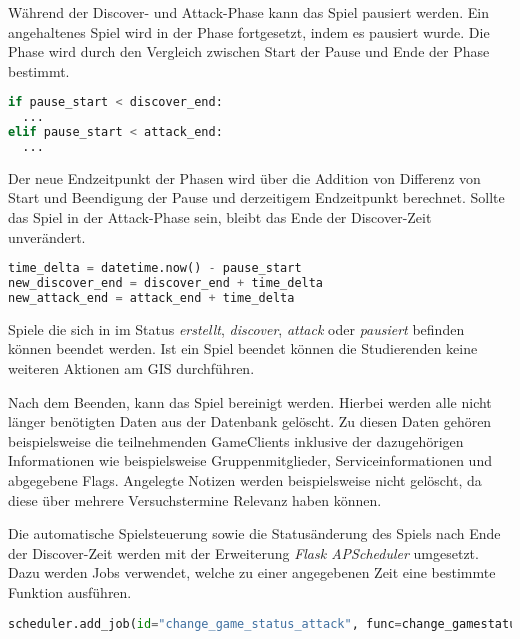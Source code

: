 Während der Discover- und Attack-Phase kann das Spiel pausiert werden. Ein angehaltenes Spiel wird in der Phase fortgesetzt, indem es pausiert wurde. Die Phase wird durch den Vergleich zwischen Start der Pause und Ende der Phase bestimmt.

\begin{lstlisting}[language=Python, frame=single, caption={GIS Spiel fortsetzen}, captionpos=b, label={lst:gis-resume-game}]
if pause_start < discover_end:
  ...
elif pause_start < attack_end:
  ...
\end{lstlisting}

Der neue Endzeitpunkt der Phasen wird über die Addition von Differenz von Start und Beendigung der Pause und derzeitigem Endzeitpunkt berechnet. Sollte das Spiel in der Attack-Phase sein, bleibt das Ende der Discover-Zeit unverändert.

\begin{lstlisting}[language=Python, frame=single, caption={GIS Spiel fortsezen}, captionpos=b, label={lst:gis-pause-add-time}]
time_delta = datetime.now() - pause_start
new_discover_end = discover_end + time_delta
new_attack_end = attack_end + time_delta
\end{lstlisting}

Spiele die sich in im Status \textit{erstellt}, \textit{discover}, \textit{attack} oder \textit{pausiert} befinden können beendet werden. Ist ein Spiel beendet können die Studierenden keine weiteren Aktionen am GIS durchführen.

Nach dem Beenden, kann das Spiel bereinigt werden. Hierbei werden alle nicht länger benötigten Daten aus der Datenbank gelöscht. Zu diesen Daten gehören beispielsweise die teilnehmenden GameClients inklusive der dazugehörigen Informationen wie beispielsweise Gruppenmitglieder, Serviceinformationen und abgegebene Flags. Angelegte Notizen werden beispielsweise nicht gelöscht, da diese über mehrere Versuchstermine Relevanz haben können.

Die automatische Spielsteuerung sowie die Statusänderung des Spiels nach Ende der Discover-Zeit werden mit der Erweiterung \textit{Flask APScheduler} umgesetzt. Dazu werden Jobs verwendet, welche zu einer angegebenen Zeit eine bestimmte Funktion ausführen.

\begin{lstlisting}[language=Python, frame=single, caption={GIS Scheduler Jobs}, captionpos=b, label={lst:gis-scheduler-jobs}]
scheduler.add_job(id="change_game_status_attack", func=change_gamestatus, trigger='date', run_date=discover_end_datetime)
\end{lstlisting}

